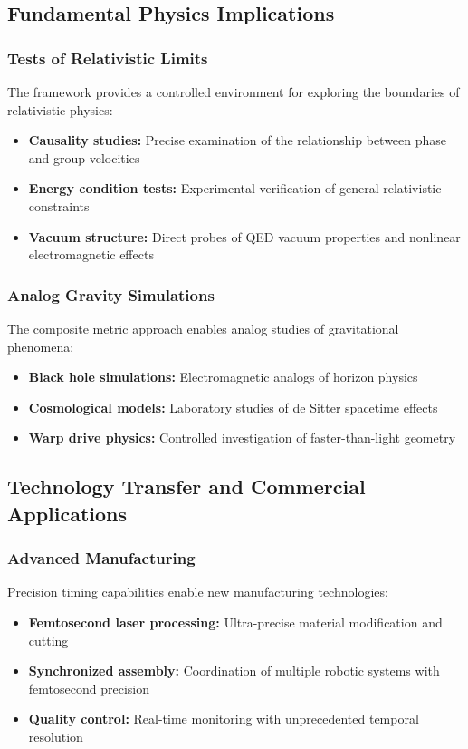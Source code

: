 \documentclass[aps,prl,reprint,groupedaddress,floatfix]{revtex4-1}
\begin{document}
\subsection{Fundamental Physics Implications}

\subsubsection{Tests of Relativistic Limits}

The framework provides a controlled environment for exploring the boundaries of relativistic physics:
\begin{itemize}
    \item \textbf{Causality studies:} Precise examination of the relationship between phase and group velocities
    \item \textbf{Energy condition tests:} Experimental verification of general relativistic constraints
    \item \textbf{Vacuum structure:} Direct probes of QED vacuum properties and nonlinear electromagnetic effects
\end{itemize}

\subsubsection{Analog Gravity Simulations}

The composite metric approach enables analog studies of gravitational phenomena:
\begin{itemize}
    \item \textbf{Black hole simulations:} Electromagnetic analogs of horizon physics
    \item \textbf{Cosmological models:} Laboratory studies of de Sitter spacetime effects
    \item \textbf{Warp drive physics:} Controlled investigation of faster-than-light geometry
\end{itemize}

\subsection{Technology Transfer and Commercial Applications}

\subsubsection{Advanced Manufacturing}

Precision timing capabilities enable new manufacturing technologies:
\begin{itemize}
    \item \textbf{Femtosecond laser processing:} Ultra-precise material modification and cutting
    \item \textbf{Synchronized assembly:} Coordination of multiple robotic systems with femtosecond precision
    \item \textbf{Quality control:} Real-time monitoring with unprecedented temporal resolution
\end{itemize}
\end{document}
